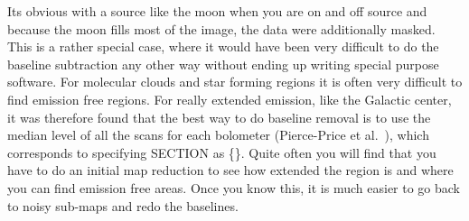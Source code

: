 \documentclass[twoside,11pt]{article}
\renewcommand{\_}{\texttt{\symbol{95}}}
\begin{document}
Its obvious with a source like the moon when you are on and off source
and because the moon fills most of the image, the data were
additionally masked.  This is a rather special case, where it would
have been very difficult to do the baseline subtraction any other way
without ending up writing special purpose software.  For molecular
clouds and star forming regions it is often very difficult to find
emission free regions.  For really extended emission, like the
Galactic center, it was therefore found that the best way to do
baseline removal is to use the median level of all the scans for each
bolometer (Pierce-Price et al.\  \cite{Pierce00}), which corresponds to
specifying SECTION as \{\}.  Quite often you will find that you have to
do an initial map reduction to see how extended the region is and
where you can find emission free areas.  Once you know this, it is
much easier to go back to noisy sub-maps and redo the baselines.
\end{document}
